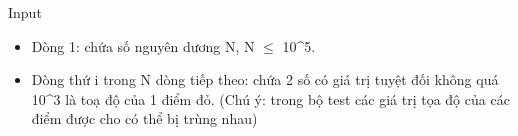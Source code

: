 Input
\begin{itemize}
	\item     Dòng 1: chứa số nguyên dương N, N $\le$ 10^5.   
	\item     Dòng thứ i trong N dòng tiếp theo: chứa 2 số có giá trị tuyệt đối không quá 10^3 là toạ độ của 1 điểm đỏ. (Chú ý: trong bộ test các giá trị tọa độ của các điểm được cho có thể bị trùng nhau)   
\end{itemize}